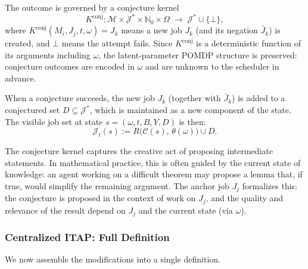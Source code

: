 The outcome is governed by a conjecture kernel
\[
K^{\mathrm{conj}} : \mathcal{M} \times \mathcal{J}^* \times \mathbb{N}_0 \times
\Omega \;\to\; \mathcal{J}^* \cup \{\bot\},
\]
where $K^{\mathrm{conj}}(M_i, J_j, t, \omega) = J_k$ means a new job $J_k$ (and its
negation $\bar J_k$) is created, and $\bot$ means the attempt fails. Since
$K^{\mathrm{conj}}$ is a deterministic function of its arguments including $\omega$,
the latent-parameter POMDP structure is preserved: conjecture outcomes are encoded in
$\omega$ and are unknown to the scheduler in advance.

When a conjecture succeeds, the new job $J_k$ (together with $\bar J_k$) is added to
a conjectured set $D \subseteq \mathcal{J}^*$, which is maintained as a new component
of the state. The visible job set at state $s = (\omega, t, B, Y, D)$ is then:
\[
\mathcal{J}_t(s) := R\bigl(\mathcal{C}(s),\, \theta(\omega)\bigr) \cup D.
\]

\begin{remark}
The conjecture kernel captures the creative act of proposing intermediate statements.
In mathematical practice, this is often guided by the current state of knowledge: an
agent working on a difficult theorem may propose a lemma that, if true, would simplify
the remaining argument. The anchor job $J_j$ formalizes this: the conjecture is
proposed in the context of work on $J_j$, and the quality and relevance of the result
depend on $J_j$ and the current state (via $\omega$).
\end{remark}

\subsubsection{Centralized ITAP: Full Definition}

We now assemble the modifications into a single definition.


